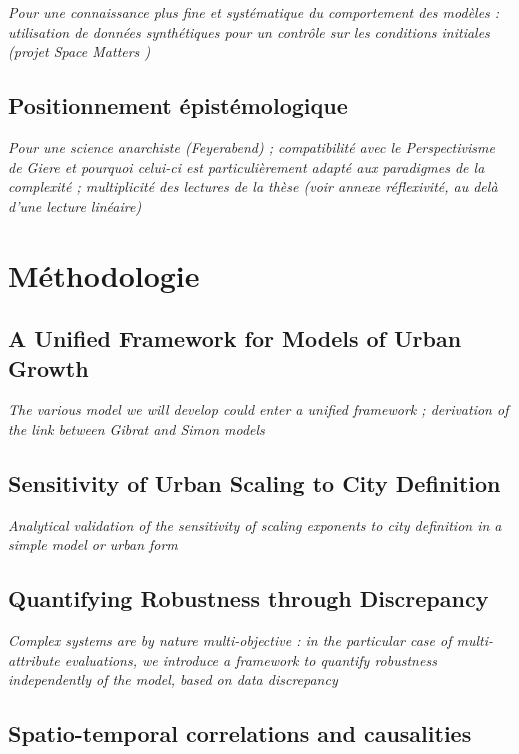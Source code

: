\textit{Pour une connaissance plus fine et systématique du comportement des modèles : utilisation de données synthétiques pour un contrôle sur les conditions initiales (projet Space Matters \cite{cottineau2015revisiting})}


\subsection{Positionnement épistémologique}

\textit{Pour une science anarchiste (Feyerabend) ; compatibilité avec le Perspectivisme de Giere et pourquoi celui-ci est particulièrement adapté aux paradigmes de la complexité ; multiplicité des lectures de la thèse (voir annexe réflexivité, au delà d'une lecture linéaire)} 




\section{Méthodologie}


\subsection{A Unified Framework for Models of Urban Growth}

\textit{The various model we will develop could enter a unified framework ; derivation of the link between Gibrat and Simon models}


\subsection{Sensitivity of Urban Scaling to City Definition}

\textit{Analytical validation of the sensitivity of scaling exponents to city definition in a simple model or urban form}

\subsection{Quantifying Robustness through Discrepancy}

\textit{Complex systems are by nature multi-objective : in the particular case of multi-attribute evaluations, we introduce a framework to quantify robustness independently of the model, based on data discrepancy~\cite{raimbault2016discrepancy}}


\subsection{Spatio-temporal correlations and causalities}

